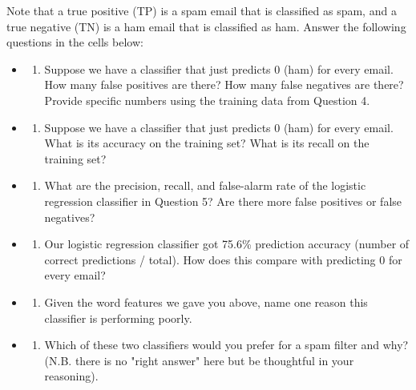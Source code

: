 \documentclass[11pt]{article}
\providecommand{\tightlist}{%
      \setlength{\itemsep}{0pt}\setlength{\parskip}{0pt}}
\begin{document}
Note that a true positive (TP) is a spam email that is classified as
spam, and a true negative (TN) is a ham email that is classified as ham.
Answer the following questions in the cells below:

\begin{itemize}
\item
  \begin{enumerate}
  \def\labelenumi{(\alph{enumi})}
  \tightlist
  \item
    Suppose we have a classifier that just predicts 0 (ham) for every
    email. How many false positives are there? How many false negatives
    are there? Provide specific numbers using the training data from
    Question 4.
  \end{enumerate}
\item
  \begin{enumerate}
  \def\labelenumi{(\alph{enumi})}
  \setcounter{enumi}{1}
  \tightlist
  \item
    Suppose we have a classifier that just predicts 0 (ham) for every
    email. What is its accuracy on the training set? What is its recall
    on the training set?
  \end{enumerate}
\item
  \begin{enumerate}
  \def\labelenumi{(\alph{enumi})}
  \setcounter{enumi}{2}
  \tightlist
  \item
    What are the precision, recall, and false-alarm rate of the logistic
    regression classifier in Question 5? Are there more false positives
    or false negatives?
  \end{enumerate}
\item
  \begin{enumerate}
  \def\labelenumi{(\alph{enumi})}
  \setcounter{enumi}{3}
  \tightlist
  \item
    Our logistic regression classifier got 75.6\% prediction accuracy
    (number of correct predictions / total). How does this compare with
    predicting 0 for every email?
  \end{enumerate}
\item
  \begin{enumerate}
  \def\labelenumi{(\alph{enumi})}
  \setcounter{enumi}{4}
  \tightlist
  \item
    Given the word features we gave you above, name one reason this
    classifier is performing poorly.
  \end{enumerate}
\item
  \begin{enumerate}
  \def\labelenumi{(\alph{enumi})}
  \setcounter{enumi}{5}
  \tightlist
  \item
    Which of these two classifiers would you prefer for a spam filter
    and why? (N.B. there is no "right answer" here but be thoughtful in
    your reasoning).
  \end{enumerate}
\end{itemize}
\end{document}
